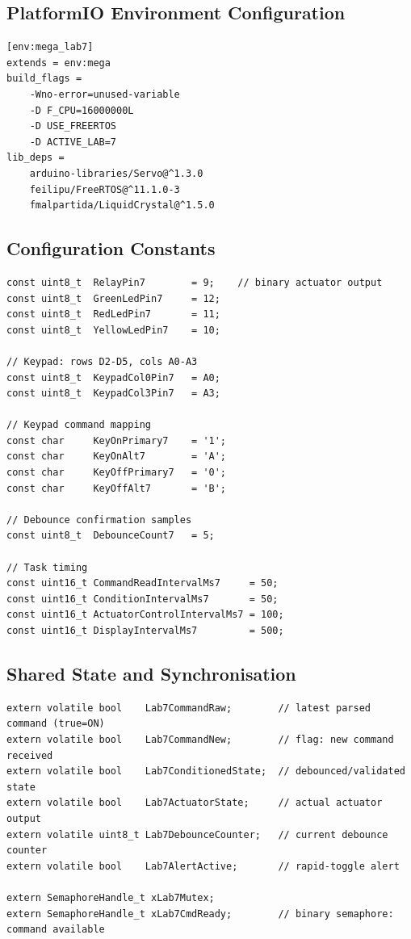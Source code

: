 \documentclass[12pt]{article}
\begin{document}
\subsection{PlatformIO Environment Configuration}

\begin{lstlisting}
[env:mega_lab7]
extends = env:mega
build_flags =
    -Wno-error=unused-variable
    -D F_CPU=16000000L
    -D USE_FREERTOS
    -D ACTIVE_LAB=7
lib_deps =
    arduino-libraries/Servo@^1.3.0
    feilipu/FreeRTOS@^11.1.0-3
    fmalpartida/LiquidCrystal@^1.5.0
\end{lstlisting}

\subsection{Configuration Constants}

\begin{lstlisting}[caption={Lab7Config.h --- key constants}]
const uint8_t  RelayPin7        = 9;    // binary actuator output
const uint8_t  GreenLedPin7     = 12;
const uint8_t  RedLedPin7       = 11;
const uint8_t  YellowLedPin7    = 10;

// Keypad: rows D2-D5, cols A0-A3
const uint8_t  KeypadCol0Pin7   = A0;
const uint8_t  KeypadCol3Pin7   = A3;

// Keypad command mapping
const char     KeyOnPrimary7    = '1';
const char     KeyOnAlt7        = 'A';
const char     KeyOffPrimary7   = '0';
const char     KeyOffAlt7       = 'B';

// Debounce confirmation samples
const uint8_t  DebounceCount7   = 5;

// Task timing
const uint16_t CommandReadIntervalMs7     = 50;
const uint16_t ConditionIntervalMs7       = 50;
const uint16_t ActuatorControlIntervalMs7 = 100;
const uint16_t DisplayIntervalMs7         = 500;
\end{lstlisting}

\subsection{Shared State and Synchronisation}

\begin{lstlisting}[caption={Lab7Sync.h --- shared volatile data + mutex + semaphore}]
extern volatile bool    Lab7CommandRaw;        // latest parsed command (true=ON)
extern volatile bool    Lab7CommandNew;        // flag: new command received
extern volatile bool    Lab7ConditionedState;  // debounced/validated state
extern volatile bool    Lab7ActuatorState;     // actual actuator output
extern volatile uint8_t Lab7DebounceCounter;   // current debounce counter
extern volatile bool    Lab7AlertActive;       // rapid-toggle alert

extern SemaphoreHandle_t xLab7Mutex;
extern SemaphoreHandle_t xLab7CmdReady;        // binary semaphore: command available
\end{lstlisting}
\end{document}
